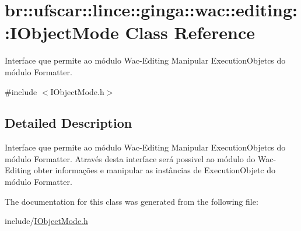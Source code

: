 \hypertarget{classbr_1_1ufscar_1_1lince_1_1ginga_1_1wac_1_1editing_1_1IObjectMode}{
\section{br::ufscar::lince::ginga::wac::editing::IObjectMode Class Reference}
\label{classbr_1_1ufscar_1_1lince_1_1ginga_1_1wac_1_1editing_1_1IObjectMode}
}


Interface que permite ao módulo Wac-\/Editing Manipular ExecutionObjetcs do módulo Formatter.  




{\ttfamily \#include $<$IObjectMode.h$>$}



\subsection{Detailed Description}
Interface que permite ao módulo Wac-\/Editing Manipular ExecutionObjetcs do módulo Formatter. Através desta interface será possivel ao módulo do Wac-\/Editing obter informações e manipular as instâncias de ExecutionObjetc do módulo Formatter. 

The documentation for this class was generated from the following file:\begin{DoxyCompactItemize}
\item 
include/\hyperlink{IObjectMode_8h}{IObjectMode.h}\end{DoxyCompactItemize}
